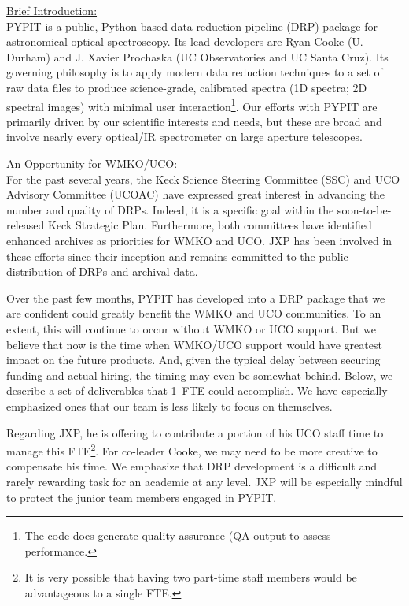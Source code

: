 \documentclass[11pt,preprint]{aastex}
\begin{document}
\vskip 0.2in

\noindent 
\uline{Brief Introduction:} \\
PYPIT is a public, Python-based data reduction pipeline
(DRP) package for astronomical optical spectroscopy.
Its lead developers are Ryan Cooke (U. Durham) and 
J. Xavier Prochaska (UC Observatories and UC Santa Cruz).
Its governing philosophy is to apply modern data reduction
techniques to a set of raw data files to produce
science-grade, calibrated spectra (1D spectra; 2D spectral
images) with minimal user interaction\footnote{The code
does generate quality assurance (QA output to assess
performance.}.  Our efforts with PYPIT are primarily driven by 
our scientific interests and needs, but these
are broad and involve nearly every optical/IR spectrometer
on large aperture telescopes.


\vskip 0.2in

\noindent 
\uline{An Opportunity for WMKO/UCO:} \\
For the past several years, the Keck Science Steering
Committee (SSC) and UCO Advisory Committee (UCOAC)
have expressed great interest in advancing the number
and quality of DRPs.  Indeed, it is a specific goal
within the soon-to-be-released Keck Strategic Plan.
Furthermore, both committees have identified enhanced
archives as priorities for WMKO and UCO.
JXP has been involved in these efforts since their 
inception and remains committed to the public distribution
of DRPs and archival data.

Over the past few months, PYPIT has developed into a 
DRP package that we are confident could greatly 
benefit the WMKO and UCO communities.  To an extent, 
this will continue to occur without WMKO or UCO support.
But we believe that now is the time when WMKO/UCO support
would have greatest impact on the future products.
And, given the typical delay between securing funding and
actual hiring,  the timing may even be somewhat behind.
Below, we describe a set of deliverables that 1~FTE could
accomplish.  We have especially emphasized ones that our 
team is less likely to focus on themselves.

Regarding JXP, he is offering to contribute a portion of his
UCO staff time to manage this FTE\footnote{It is very possible
that having two part-time staff members would be advantageous
to a single FTE.}.  For co-leader Cooke, we may need to
be more creative to compensate his time.
We emphasize that DRP development is a difficult and
rarely rewarding task for an academic at any level.
JXP will be especially mindful to protect the junior 
team members engaged in PYPIT.
\end{document}
